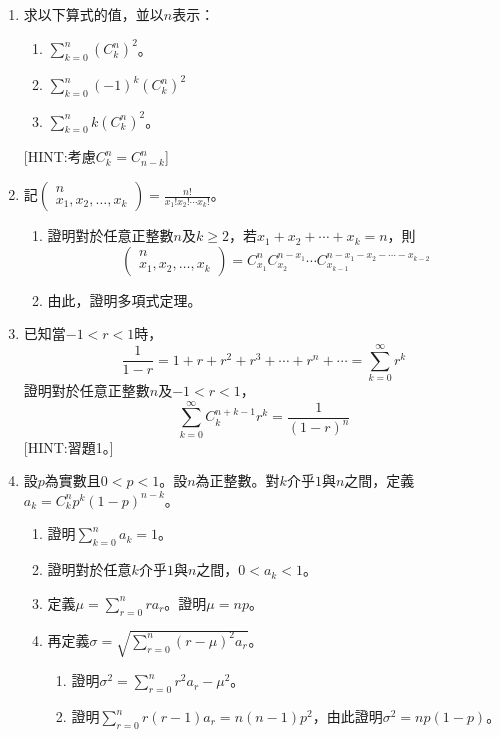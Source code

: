 \documentclass[12pt]{article}
\begin{document}
\begin{enumerate}
        [HINT:考慮$(1+x)^{p+q}=(1+x)^p(1+x)^q$]
        \item 求以下算式的值，並以$n$表示：\begin{enumerate}
            \item $\sum_{k=0}^{n}(C_k^n)^2$。
            \item $\sum_{k=0}^{n}(-1)^k(C_k^n)^2$
            \item $\sum_{k=0}^{n}k(C_k^n)^2$。
        \end{enumerate}
        [HINT:考慮$C_k^n=C_{n-k}^n$]
        \item 記$\begin{pmatrix}
            n\\x_1,x_2,\dots,x_k
        \end{pmatrix}=\frac{n!}{x_1!x_2!\cdots x_k!}$。\begin{enumerate}
            \item 證明對於任意正整數$n$及$k\geq 2$，若$x_1+x_2+\cdots+x_k=n$，則$$\begin{pmatrix}
                n\\x_1,x_2,\dots,x_k
            \end{pmatrix}=C_{x_1}^n C_{x_2}^{n-x_1}\cdots C_{x_{k-1}}^{n-x_1-x_2-\cdots-x_{k-2}}$$
            \item 由此，證明多項式定理。
        \end{enumerate}
        \item 已知當$-1<r<1$時，$$\frac{1}{1-r}=1+r+r^2+r^3+\cdots+r^n+\cdots=\sum_{k=0}^{\infty}r^k$$證明對於任意正整數$n$及$-1<r<1$，$$\sum_{k=0}^\infty C_k^{n+k-1}r^k=\frac{1}{(1-r)^n}$$[HINT:習題1。]
        \item 設$p$為實數且$0<p<1$。設$n$為正整數。對$k$介乎$1$與$n$之間，定義$a_k=C_k^n p^k(1-p)^{n-k}$。\begin{enumerate}
            \item 證明$\sum_{k=0}^{n}a_k=1$。
            \item 證明對於任意$k$介乎$1$與$n$之間，$0<a_k<1$。
            \item 定義$\mu=\sum_{r=0}^{n}ra_r$。證明$\mu=np$。
            \item 再定義$\sigma=\sqrt{\sum_{r=0}^n (r-\mu)^2a_r}$。\begin{enumerate}
                \item 證明$\sigma^2=\sum_{r=0}^{n}r^2a_r-\mu^2$。
                \item 證明$\sum_{r=0}^{n}r(r-1)a_r=n(n-1)p^2$，由此證明$\sigma^2=np(1-p)$。
            \end{enumerate}
        \end{enumerate}
    \end{enumerate}
\end{document}
